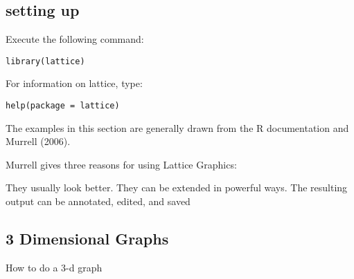 \subsection{setting up}
Execute the following command:
\begin{framed}
\begin{verbatim}
library(lattice)
\end{verbatim}
\end{framed}
For information on lattice, type:
\begin{framed}
\begin{verbatim}
help(package = lattice)
\end{verbatim}
\end{framed}
The examples in this section are generally drawn from the R documentation and Murrell (2006).

Murrell gives three reasons for using Lattice Graphics:

They usually look better.
They can be extended in powerful ways.
The resulting output can be annotated, edited, and saved

\subsection{3 Dimensional Graphs}
How to do a 3-d graph
